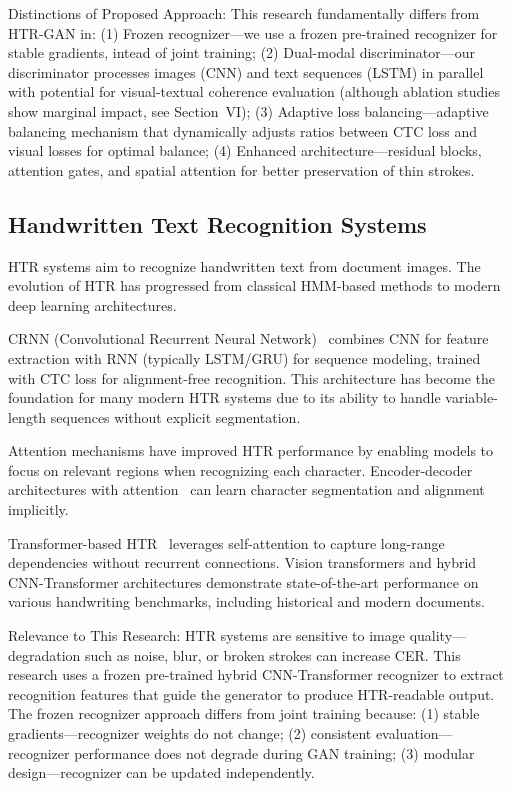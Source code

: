\documentclass[journal]{IEEEtran}
\begin{document}
Distinctions of Proposed Approach: This research fundamentally differs from HTR-GAN in: (1) Frozen recognizer—we use a frozen pre-trained recognizer for stable gradients, intead of joint training; (2) Dual-modal discriminator—our discriminator processes images (CNN) and text sequences (LSTM) in parallel with potential for visual-textual coherence evaluation (although ablation studies show marginal impact, see Section~VI); (3) Adaptive loss balancing—adaptive balancing mechanism that dynamically adjusts ratios between CTC loss and visual losses for optimal balance; (4) Enhanced architecture—residual blocks, attention gates, and spatial attention for better preservation of thin strokes.

\subsection{Handwritten Text Recognition Systems}

HTR systems aim to recognize handwritten text from document images. The evolution of HTR has progressed from classical HMM-based methods to modern deep learning architectures.

CRNN (Convolutional Recurrent Neural Network)~\cite{shi2016crnn} combines CNN for feature extraction with RNN (typically LSTM/GRU) for sequence modeling, trained with CTC loss for alignment-free recognition. This architecture has become the foundation for many modern HTR systems due to its ability to handle variable-length sequences without explicit segmentation.

Attention mechanisms have improved HTR performance by enabling models to focus on relevant regions when recognizing each character. Encoder-decoder architectures with attention~\cite{bluche2017scan} can learn character segmentation and alignment implicitly.

Transformer-based HTR~\cite{michael2019evaluating,diaz2021rethinking} leverages self-attention to capture long-range dependencies without recurrent connections. Vision transformers and hybrid CNN-Transformer architectures demonstrate state-of-the-art performance on various handwriting benchmarks, including historical and modern documents.

Relevance to This Research: HTR systems are sensitive to image quality—degradation such as noise, blur, or broken strokes can increase CER. This research uses a frozen pre-trained hybrid CNN-Transformer recognizer to extract recognition features that guide the generator to produce HTR-readable output. The frozen recognizer approach differs from joint training because: (1) stable gradients—recognizer weights do not change; (2) consistent evaluation—recognizer performance does not degrade during GAN training; (3) modular design—recognizer can be updated independently.
\end{document}

